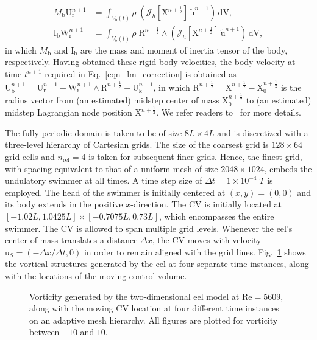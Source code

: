 \documentclass[review]{elsarticle}
\renewcommand{\vec}[1]{\bm{\mathrm{#1}}}
\def \u{\vec{u}}
\def \uS{\vec{u}_S}
\def \I{\vec{I}}
\def \U{\vec{U}}
\def \Vbt{V_b(t)}
\def \I{\vec{I}}
\def \Ib{\I_{\text{b}}}
\def \Mb{M_{\text{b}}}
\def \R{\vec{R}}
\def \U{\vec{U}}
\def \Ub{\U_{\text{b}}}
\def \Uk{\U_{\text{k}}}
\def \Ur{\U_{\text{r}}}
\def \W{\vec{W}}
\def \Wr{\W_{\text{r}}}
\def \X{\vec{X}}
\def \cJ{\vec{\mathcal{J}}}
\def \half{\frac{1}{2}}
\def \nref{n_{\text{ref}}}
\def \u{\vec{u}}
\def \Re{\text{Re}}
\def \dt{\Delta t}
\def \dx{\Delta x}
\def \dV{\,\mathrm{dV}}
\def \dt{\Delta t}
\def \dx{\Delta x}
\begin{document}
\begin{align}
\Mb \Ur^{n+1} & = \int_{\Vbt} \rho \; \left(\cJ_h[\X^{n+\half}] \, \tilde{\u}^{n+1} \right) \dV, 
\label{eq_conserve_linear_mom}\\
\Ib \Wr^{n+1} & = \int_{\Vbt} \rho \; \R^{n+\half} \wedge \left(\cJ_h[\X^{n+\half}] \, \tilde{\u}^{n+1}  \right) \dV, \label{eq_conserve_angular_mom}
\end{align}
in which $\Mb$ and $\Ib$ are the mass and moment of inertia tensor of the body, respectively.
Having obtained these rigid body velocities, the body velocity at time $t^{n+1}$ required in 
Eq.~\eqref{eqn_lm_correction} is obtained as $\Ub^{n+1} = \Ur^{n+1} + \Wr^{n+1} \wedge \R^{n+\half} + \Uk^{n+1}$,
in which $\R^{n+\half} = \X^{n+\half} - \X^{n+\half}_0$ is the radius vector from (an estimated) midstep  
center of mass $\X_0^{n+\half}$ to (an estimated) midstep Lagrangian node position $\X^{n+\half}$.
We refer readers to~\cite{Bhalla13} for more details.

The fully periodic domain is taken to be of size $8L \times 4L$ and is discretized with a 
three-level hierarchy of Cartesian grids. The size of the coarsest grid is  
$128 \times 64$ grid cells and $\nref = 4$ is taken for subsequent finer grids. Hence, the 
finest grid, with spacing equivalent to that of a uniform mesh of size $2048 \times 1024$, embeds 
the undulatory swimmer at all times. A time step size of $\dt = 1\times 10^{-4}\;T$ is employed. 
The head of the swimmer is initially centered at $(x,y) = (0,0)$ and its body extends in the 
positive $x$-direction. The CV is initially located at $[-1.02L, 1.0425L] \times [-0.7075L, 0.73L]$,
which encompasses the entire swimmer. The CV is allowed to span multiple grid levels.
Whenever the eel's center of mass translates
a distance $\dx$, the CV moves with velocity $\uS =  (-\dx/\dt,0)$ in order to remain aligned with
the grid lines. Fig.~\ref{fig_eel_viz} shows the vortical structures generated by the eel
at four separate time instances, along with the locations of the moving control volume.

\begin{figure}[H]
  \centering
  \caption{Vorticity generated by the two-dimensional eel model at $\Re = 5609$,
  along with the moving CV location at four different time instances on an adaptive mesh hierarchy. 
  All figures are plotted for vorticity between $-10$ and $10$.
   }
  \label{fig_eel_viz}
\end{figure}
\end{document}
